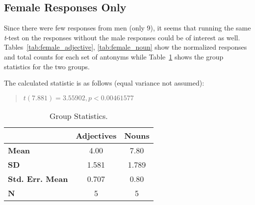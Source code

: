 \subsection{Female Responses Only}
Since there were few responses from men (only 9), it seems that running the same \textit{t}-test on the responses without the male responses could be of interest as well.  Tables~\ref{tab:female_adjective}, \ref{tab:female_noun} show the normalized responses and total counts for each set of antonyms while Table~\ref{tab:female_group_stats} shows the group statistics for the two groups.





The calculated statistic is as follows (equal variance not assumed):
	\begin{quote}
		$t(7.881)=3.55902, p < 0.00461577$ 
	\end{quote}


\begin{table}
	\begin{center}
		\begin{tabular}{|l|c|c|} \hline
									& \textbf{Adjectives} 	& \textbf{Nouns}  \\ \hline \hline
			\textbf{Mean} 			& 4.00					& 7.80	\\
			\textbf{SD} 			& 1.581					& 1.789	\\
			\textbf{Std. Err. Mean} & 0.707					& 0.80	\\
			\textbf{N} 				& 5						& 5		\\
			\hline
		\end{tabular}
	\end{center}
	\caption {Group Statistics.}
	\label{tab:female_group_stats}
\end{table}




%
